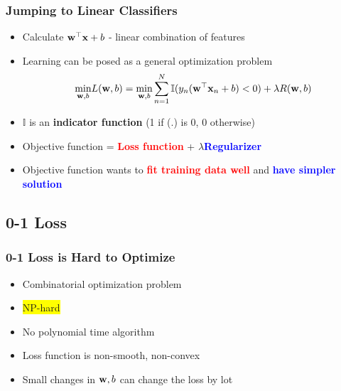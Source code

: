 \documentclass[10pt]{beamer}
\newcommand{\hilight}[1]{\colorbox{yellow}{#1}}
\begin{document}
\begin{frame}
\frametitle{Jumping to Linear Classifiers}
\begin{itemize}
\item Calculate ${\bf w^\top x} + b$ - linear combination of features
\item Learning can be posed as a general optimization problem
  \[
  \underset{{\bf w},b}{\text{min}} L({\bf w},b) = \underset{{\bf w},b}{\text{min}} \sum_{n=1}^N\mathbb{I}(y_n({\bf w}^\top{\bf x}_n + b) < 0) + \lambda R({\bf w},b)
  \]
\item $\mathbb{I}$ is an {\bf indicator function} (1 if (.) is 0, 0 otherwise)
\item Objective function = \textcolor{red}{\bf Loss function} + $\lambda$\textcolor{blue}{\bf Regularizer}
\item Objective function wants to \textcolor{red}{\bf fit training data well} and \textcolor{blue}{\bf have simpler solution}
\end{itemize}
\end{frame}
\subsection{0-1 Loss}
\begin{frame}
  \frametitle{0-1 Loss is Hard to Optimize}
  \begin{itemize}
  \item Combinatorial optimization problem
  \item \hilight{NP-hard}
  \item No polynomial time algorithm
  \item Loss function is non-smooth, non-convex
  \item Small changes in ${\bf w},b$ can change the loss by lot
  \end{itemize}
\end{frame}
\end{document}
